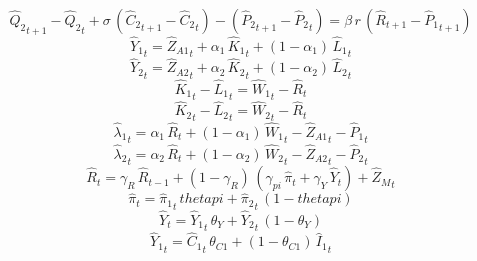 \begin{dmath}
{{\hat{Q}_{2}}}_{t+1}-{{\hat{Q}_{2}}}_{t}+{{\sigma}}\, \left({{\hat{C}_{2}}}_{t+1}-{{\hat{C}_{2}}}_{t}\right)-\left({{\hat{P}_{2}}}_{t+1}-{{\hat{P}_{2}}}_{t}\right)={{\beta}}\, {r}\, \left({{\hat{R}}}_{t+1}-{{\hat{P}_{1}}}_{t+1}\right)
\end{dmath}
\begin{dmath}
{{\hat{Y}_{1}}}_{t}={{\hat{Z}_{A1}}}_{t}+{{\alpha_{1}}}\, {{\hat{K}_{1}}}_{t}+\left(1-{{\alpha_{1}}}\right)\, {{\hat{L}_{1}}}_{t}
\end{dmath}
\begin{dmath}
{{\hat{Y}_{2}}}_{t}={{\hat{Z}_{A2}}}_{t}+{{\alpha_{2}}}\, {{\hat{K}_{2}}}_{t}+\left(1-{{\alpha_{2}}}\right)\, {{\hat{L}_{2}}}_{t}
\end{dmath}
\begin{dmath}
{{\hat{K}_{1}}}_{t}-{{\hat{L}_{1}}}_{t}={{\hat{W}_{1}}}_{t}-{{\hat{R}}}_{t}
\end{dmath}
\begin{dmath}
{{\hat{K}_{2}}}_{t}-{{\hat{L}_{2}}}_{t}={{\hat{W}_{2}}}_{t}-{{\hat{R}}}_{t}
\end{dmath}
\begin{dmath}
{{\hat{\lambda}_{1}}}_{t}={{\alpha_{1}}}\, {{\hat{R}}}_{t}+\left(1-{{\alpha_{1}}}\right)\, {{\hat{W}_{1}}}_{t}-{{\hat{Z}_{A1}}}_{t}-{{\hat{P}_{1}}}_{t}
\end{dmath}
\begin{dmath}
{{\hat{\lambda}_{2}}}_{t}={{\alpha_{2}}}\, {{\hat{R}}}_{t}+\left(1-{{\alpha_{2}}}\right)\, {{\hat{W}_{2}}}_{t}-{{\hat{Z}_{A2}}}_{t}-{{\hat{P}_{2}}}_{t}
\end{dmath}
\begin{dmath}
{{\hat{R}}}_{t}={{\gamma_{R}}}\, {{\hat{R}}}_{t-1}+\left(1-{{\gamma_{R}}}\right)\, \left({{\gamma_{pi}}}\, {{\hat{\pi}}}_{t}+{{\gamma_{Y}}}\, {{\hat{Y}}}_{t}\right)+{{\hat{Z}_M}}_{t}
\end{dmath}
\begin{dmath}
{{\hat{\pi}}}_{t}={{\hat{\pi}_{1}}}_{t}\, {thetapi}+{{\hat{\pi}_{2}}}_{t}\, \left(1-{thetapi}\right)
\end{dmath}
\begin{dmath}
{{\hat{Y}}}_{t}={{\hat{Y}_{1}}}_{t}\, {{\theta_{Y}}}+{{\hat{Y}_{2}}}_{t}\, \left(1-{{\theta_{Y}}}\right)
\end{dmath}
\begin{dmath}
{{\hat{Y}_{1}}}_{t}={{\hat{C}_{1}}}_{t}\, {{\theta_{C1}}}+\left(1-{{\theta_{C1}}}\right)\, {{\hat{I}_{1}}}_{t}
\end{dmath}
